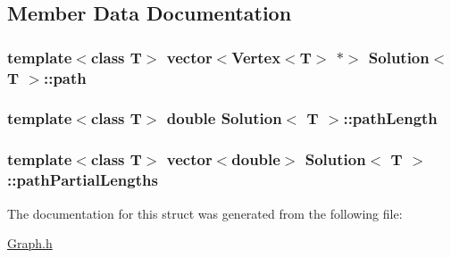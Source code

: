 \subsection{Member Data Documentation}
\hypertarget{struct_solution_aeef1555c80acbacaded58ee4b46e4cd3}{}
\subsubsection[{path}]{\setlength{\rightskip}{0pt plus 5cm}template$<$class T$>$ vector$<${\bf Vertex}$<$T$>$ $\ast$$>$ {\bf Solution}$<$ T $>$\+::path}\label{struct_solution_aeef1555c80acbacaded58ee4b46e4cd3}
\hypertarget{struct_solution_aa44e82c1ee279c5cf70011f95d3478bf}{}
\subsubsection[{path\+Length}]{\setlength{\rightskip}{0pt plus 5cm}template$<$class T$>$ double {\bf Solution}$<$ T $>$\+::path\+Length}\label{struct_solution_aa44e82c1ee279c5cf70011f95d3478bf}
\hypertarget{struct_solution_a3a4fc51d85a3d238f8f49fd4e21430a0}{}
\subsubsection[{path\+Partial\+Lengths}]{\setlength{\rightskip}{0pt plus 5cm}template$<$class T$>$ vector$<$double$>$ {\bf Solution}$<$ T $>$\+::path\+Partial\+Lengths}\label{struct_solution_a3a4fc51d85a3d238f8f49fd4e21430a0}


The documentation for this struct was generated from the following file\+:\begin{DoxyCompactItemize}
\item 
\hyperlink{_graph_8h}{Graph.\+h}\end{DoxyCompactItemize}
